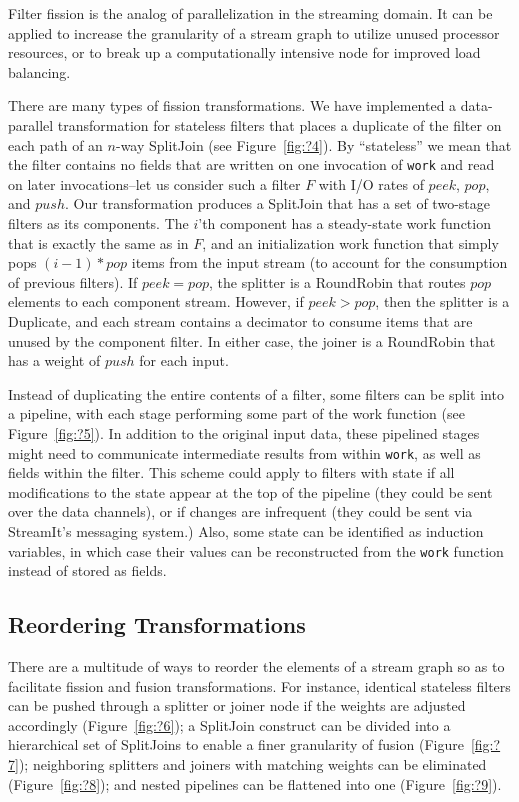 Filter fission is the analog of parallelization in the streaming
domain.  It can be applied to increase the granularity of a stream
graph to utilize unused processor resources, or to break up a
computationally intensive node for improved load balancing.  

There are many types of fission transformations.  We have implemented
a data-parallel transformation for stateless filters that places a
duplicate of the filter on each path of an $n$-way SplitJoin (see
Figure~\ref{fig:?4}).  By ``stateless'' we mean that the filter
contains no fields that are written on one invocation of {\tt work}
and read on later invocations--let us consider such a filter $F$ with
I/O rates of $peek$, $pop$, and $push$.  Our transformation produces a
SplitJoin that has a set of two-stage filters as its components.  The
$i$'th component has a steady-state work function that is exactly the
same as in $F$, and an initialization work function that simply pops
$(i-1)*pop$ items from the input stream (to account for the
consumption of previous filters).  If $peek=pop$, the splitter is a
RoundRobin that routes $pop$ elements to each component stream.
However, if $peek>pop$, then the splitter is a Duplicate, and each
stream contains a decimator to consume items that are unused by the
component filter.  In either case, the joiner is a RoundRobin that has
a weight of $push$ for each input.

Instead of duplicating the entire contents of a filter, some filters
can be split into a pipeline, with each stage performing some part of
the work function (see Figure~\ref{fig:?5}).  In addition to the
original input data, these pipelined stages might need to communicate
intermediate results from within {\tt work}, as well as fields within
the filter.  This scheme could apply to filters with state if all
modifications to the state appear at the top of the pipeline (they
could be sent over the data channels), or if changes are infrequent
(they could be sent via StreamIt's messaging system.)  Also, some
state can be identified as induction variables, in which case their
values can be reconstructed from the {\tt work} function instead of
stored as fields.

\subsection{Reordering Transformations}

There are a multitude of ways to reorder the elements of a stream
graph so as to facilitate fission and fusion transformations.  For
instance, identical stateless filters can be pushed through a splitter
or joiner node if the weights are adjusted accordingly
(Figure~\ref{fig:?6}); a SplitJoin construct can be divided into a
hierarchical set of SplitJoins to enable a finer granularity of fusion
(Figure~\ref{fig:?7}); neighboring splitters and joiners with matching
weights can be eliminated (Figure~\ref{fig:?8}); and nested pipelines
can be flattened into one (Figure~\ref{fig:?9}).

